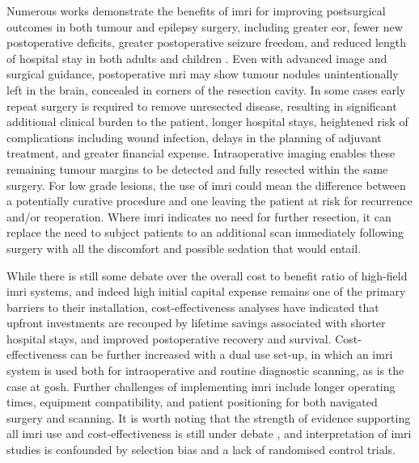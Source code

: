 Numerous works demonstrate the benefits of \gls{imri} for improving postsurgical outcomes in both tumour and epilepsy surgery, including greater \gls{eor}, fewer new postoperative deficits, greater postoperative seizure freedom, and reduced length of hospital stay in both adults and children
\autocite{Shah2012,Zhang2015a,Sacino2016,Rao2017c,Giordano2017,Lu2018a,Garzon-Muvdi2019,Leroy2019,Karsy2019,Golub2020,Hlavac2020,Englman2021}.
Even with advanced image and surgical guidance, postoperative \gls{mri} may show tumour nodules unintentionally left in the brain, concealed in corners of the resection cavity.
In some cases early repeat surgery is required to remove unresected disease, resulting in significant additional clinical burden to the patient, longer hospital stays, heightened risk of complications including wound infection\autocite{Tenney1985,Chang2003}, delays in the planning of adjuvant treatment, and greater financial expense\autocite{Shah2012}.
Intraoperative imaging enables these remaining tumour margins to be detected and fully resected within the same surgery\autocite{Sattur2019,Hlavac2020}.
For low grade lesions, the use of \gls{imri} could mean the difference between a potentially curative procedure and one leaving the patient at risk for recurrence and/or reoperation\autocite{Shah2012}.
Where \gls{imri} indicates no need for further resection, it can replace the need to subject patients to an additional scan immediately following surgery with all the discomfort and possible sedation that would entail.

While there is still some debate over the overall cost to benefit ratio of high-field \gls{imri} systems\autocite{Eljamel2016,Giordano2016a,Giussani2022}, and indeed high initial capital expense remains one of the primary barriers to their installation, cost-effectiveness analyses have indicated that upfront investments are recouped by lifetime savings associated with shorter hospital stays, and improved postoperative recovery and survival\autocite{Giordano2016a,Sacino2018}.
Cost-effectiveness can be further increased with a dual use set-up, in which an \gls{imri} system is used both for intraoperative and routine diagnostic scanning\autocite{Giordano2016a}, as is the case at \gls{gosh}.
Further challenges of implementing \gls{imri} include longer operating times, equipment compatibility, and patient positioning for both navigated surgery and scanning\autocite{Giordano2017}.
It is worth noting that the strength of evidence supporting all \gls{imri} use and cost-effectiveness is still under debate \autocite{Jenkinson2018,Garzon-Muvdi2019,Caras2020}, and interpretation of \gls{imri} studies is confounded by selection bias and a lack of randomised control trials\autocite{Kubben2011}.

